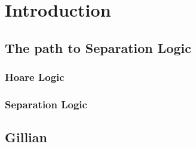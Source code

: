 \chapter{Introduction}


\section{The path to Separation Logic}

\subsection{Hoare Logic}

\subsection{Separation Logic}


\section{Gillian}

